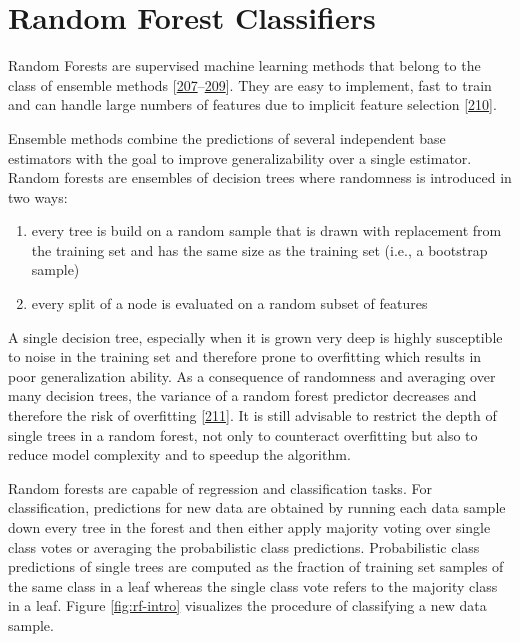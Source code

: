 \documentclass[11pt,a4paper,twoside]{book}
\providecommand{\tightlist}{%
  \setlength{\itemsep}{0pt}\setlength{\parskip}{0pt}}
\theoremstyle{definition}
\theoremstyle{definition}
\theoremstyle{remark}
\begin{document}
\section{Random Forest Classifiers}\label{random-forest-classifiers}

Random Forests are supervised machine learning methods that belong to
the class of ensemble methods
{[}\protect\hyperlink{ref-Ho1998}{207}--\protect\hyperlink{ref-Breiman2001}{209}{]}.
They are easy to implement, fast to train and can handle large numbers
of features due to implicit feature selection
{[}\protect\hyperlink{ref-Menze2009}{210}{]}.

Ensemble methods combine the predictions of several independent base
estimators with the goal to improve generalizability over a single
estimator. Random forests are ensembles of decision trees where
randomness is introduced in two ways:

\begin{enumerate}
\def\labelenumi{\arabic{enumi}.}
\tightlist
\item
  every tree is build on a random sample that is drawn with replacement
  from the training set and has the same size as the training set (i.e.,
  a bootstrap sample)
\item
  every split of a node is evaluated on a random subset of features
\end{enumerate}

A single decision tree, especially when it is grown very deep is highly
susceptible to noise in the training set and therefore prone to
overfitting which results in poor generalization ability. As a
consequence of randomness and averaging over many decision trees, the
variance of a random forest predictor decreases and therefore the risk
of overfitting {[}\protect\hyperlink{ref-Louppe2014}{211}{]}. It is
still advisable to restrict the depth of single trees in a random
forest, not only to counteract overfitting but also to reduce model
complexity and to speedup the algorithm.

Random forests are capable of regression and classification tasks. For
classification, predictions for new data are obtained by running each
data sample down every tree in the forest and then either apply majority
voting over single class votes or averaging the probabilistic class
predictions. Probabilistic class predictions of single trees are
computed as the fraction of training set samples of the same class in a
leaf whereas the single class vote refers to the majority class in a
leaf. Figure \ref{fig:rf-intro} visualizes the procedure of classifying
a new data sample.
\end{document}
